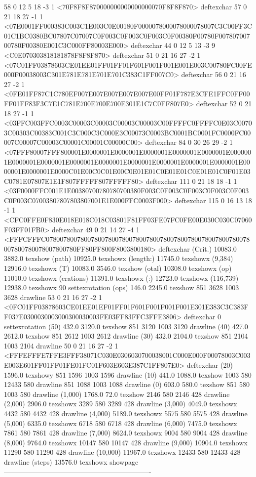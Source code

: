 58 0 12 5 18 -3 1 {{<70F8F8F870000000000000000070F8F8F870>}} deftexchar
57 0 21 18 27 -1 1 {{<07E0001FF000383C003C1E003C0E00180F0000078000078000078007C3C00FF3C01C1BC0380BC07807C07007C0F003C0F003C0F003C0F00380F00780F00780700700780F00380E001C3C000FF80003E000>}} deftexchar
44 0 12 5 13 -3 9 {{<C0E070303818181878F8F8F870>}} deftexchar
51 0 21 16 27 -2 1 {{<07C01FF03878603CE01EE01FF01FF01F601F001F001E001E003C00780FC00FE000F00038003C301E781E781E701E701C383C1FF007C0>}} deftexchar
56 0 21 16 27 -2 1 {{<0FE01FF87C1C780EF007E007E007E007E007E00FF01F787E3CFE1FFC0FF00FF01FF83F3C7E1C781E700E700E700E301E1C7C0FF807E0>}} deftexchar
52 0 21 18 27 -1 1 {{<03FFC003FFC0003C00003C00003C00003C00003C00FFFFC0FFFFC0E03C00703C00303C00383C001C3C000C3C000E3C00073C0003BC0001BC0001FC0000FC00007C00007C00003C00001C00001C00000C00>}} deftexchar
84 0 30 26 29 -2 1 {{<07FFF80007FFF800001E0000001E0000001E0000001E0000001E0000001E0000001E0000001E0000001E0000001E0000001E0000001E0000001E0000001E0000001E0000001E0000001E0000C01E00C0C01E00C0E01E01C0E01E01C0E01E01C0F01E03C0781E07807E1E1F807FFFFF807FFFFF80>}} deftexchar
111 0 21 18 18 -1 1 {{<03F0000FFC001E1E00380700780780700380F003C0F003C0F003C0F003C0F003C0F003C07003807807803807001E1E000FFC0003F000>}} deftexchar
115 0 16 13 18 -1 1 {{<CFC0FFE0F830E018E018C018C03801F81FF03FE07FC0FE00E030C030C07060F03FF01FB0>}} deftexchar
49 0 21 14 27 -4 1 {{<FFFCFFFC07800780078007800780078007800780078007800780078007800780078007800780078007800780FF80FF800F8003800180>}} deftexchar
(Crit.) 10083.0 3882.0 texshow
(path) 10925.0 texshowx
(length:) 11745.0 texshowx
(9,384) 12916.0 texshowx
(T) 10083.0 3546.0 texshow
(otal) 10308.0 texshowx
(op) 11010.0 texshowx
(erations) 11391.0 texshowx
(:) 12723.0 texshowx
(116,739) 12938.0 texshowx
90 settexrotation
(ops) 146.0 2245.0 texshow
851 3628 1003 3628 drawline
53 0 21 16 27 -2 1 {{<0FC01FF03878603CE01EE01EF01FF01F601F001F001F001E301E383C3C383FF037E0300030003000300030003FE03FF83FFC3FFE3806>}} deftexchar
0 settexrotation
(50) 432.0 3120.0 texshow
851 3120 1003 3120 drawline
(40) 427.0 2612.0 texshow
851 2612 1003 2612 drawline
(30) 432.0 2104.0 texshow
851 2104 1003 2104 drawline
50 0 21 16 27 -2 1 {{<FFFEFFFE7FFE3FFF38071C030E0306030700038001C000E000F00078003C003E003E601FF01FF01FE01FC01F603E603E387C1FF807E0>}} deftexchar
(20) 1596.0 texshowy
851 1596 1003 1596 drawline
(10) 441.0 1088.0 texshow
1003 580 12433 580 drawline
851 1088 1003 1088 drawline
(0) 603.0 580.0 texshow
851 580 1003 580 drawline
(1,000) 1768.0 72.0 texshow
2146 580 2146 428 drawline
(2,000) 2906.0 texshowx
3289 580 3289 428 drawline
(3,000) 4049.0 texshowx
4432 580 4432 428 drawline
(4,000) 5189.0 texshowx
5575 580 5575 428 drawline
(5,000) 6335.0 texshowx
6718 580 6718 428 drawline
(6,000) 7475.0 texshowx
7861 580 7861 428 drawline
(7,000) 8624.0 texshowx
9004 580 9004 428 drawline
(8,000) 9764.0 texshowx
10147 580 10147 428 drawline
(9,000) 10904.0 texshowx
11290 580 11290 428 drawline
(10,000) 11967.0 texshowx
12433 580 12433 428 drawline
(steps) 13576.0 texshowx
showpage
----------------------------------------------------------------

